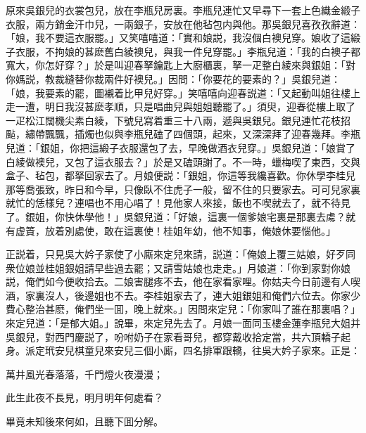 原來吳銀兒的衣裳包兒，放在李瓶兒房裏。李瓶兒連忙又早尋下一套上色織金緞子衣服，兩方銷金汗巾兒，一兩銀子，安放在他毡包内與他。那吳銀兒喜孜孜辭道：「娘，我不要這衣服罷。」又笑嘻嘻道：「實和娘説，我沒個白襖兒穿。娘收了這緞子衣服，不拘娘的甚麽舊白綾襖兒，與我一件兒穿罷。」李瓶兒道：「我的白襖子都寬大，你怎好穿？」於是叫迎春拏鑰匙上大廚櫃裏，拏一疋整白綾來與銀姐：「對你媽説，教裁縫替你裁兩件好襖兒。」因問：「你要花的要素的？」吳銀兒道：「娘，我要素的罷，圖襯着比甲兒好穿。」笑嘻嘻向迎春説道：「又起動叫姐往樓上走一遭，明日我沒甚麽孝順，只是唱曲兒與姐姐聽罷了。」須臾，迎春從樓上取了一疋松江闊機尖素白綾，下號兒寫着重三十八兩，遞與吳銀兒。銀兒連忙花枝招颭，繡帶飄飄，插燭也似與李瓶兒磕了四個頭，起來，又深深拜了迎春幾拜。李瓶兒道：「銀姐，你把這緞子衣服還包了去，早晚做酒衣兒穿。」吳銀兒道：「娘賞了白綾做襖兒，又包了這衣服去？」於是又磕頭謝了。不一時，蠟梅喫了東西，交與盒子、毡包，都拏回家去了。月娘便説：「銀姐，你這等我纔喜歡。你休學李桂兒那等喬張致，昨日和今早，只像臥不住虎子一般，留不住的只要家去。可可兒家裏就忙的恁樣兒？連唱也不用心唱了！見他家人來接，飯也不喫就去了，就不待見了。銀姐，你快休學他！」吳銀兒道：「好娘，這裏一個爹娘宅裏是那裏去䖏？就有虚篢，放着別處使，敢在這裏使！桂姐年幼，他不知事，俺娘休要惱他。」

正説着，只見吳大妗子家使了小廝來定兒來請，説道：「俺娘上覆三姑娘，好歹同衆位娘並桂姐銀姐請早些過去罷；又請雪姑娘也走走。」月娘道：「你到家對你娘説，俺們如今便收拾去。二娘害腿疼不去，他在家看家哩。你姑夫今日前邊有人喫酒，家裏沒人，後邊姐也不去。李桂姐家去了，連大姐銀姐和俺們六位去。你家少費心整治甚麽，俺們坐一囬，晚上就來。」因問來定兒：「你家叫了誰在那裏唱？」來定兒道：「是郁大姐。」說畢，來定兒先去了。月娘一面同玉樓金蓮李瓶兒大姐并吳銀兒，對西門慶説了，吩咐奶子在家看哥兒，都穿戴收拾定當，共六頂轎子起身。派定玳安兒棋童兒來安兒三個小廝，四名排軍跟轎，往吳大妗子家來。正是：

\begin{myquote}
萬井風光春落落，千門燈火夜漫漫；

此生此夜不長見，明月明年何處看？
\end{myquote}

畢竟未知後來何如，且聽下囬分解。

